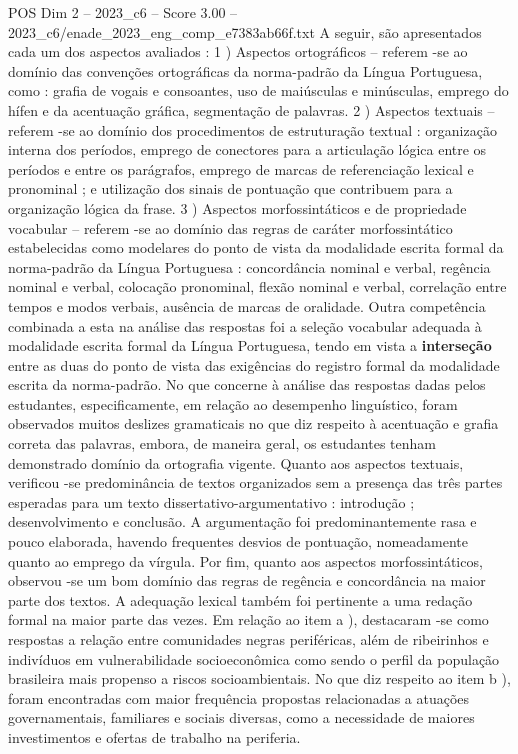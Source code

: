 \begin{textsample}{POS Dim 2 – 2023\_c6 – Score 3.00 – 2023\_c6/enade\_2023\_eng\_comp\_e7383ab66f.txt}
A seguir, são apresentados cada um dos aspectos avaliados : 1 ) Aspectos ortográficos – referem -se ao domínio das convenções ortográficas da norma-padrão da Língua Portuguesa, como : grafia de vogais e consoantes, uso de maiúsculas e minúsculas, emprego do hífen e da acentuação gráfica, segmentação de palavras. 2 ) Aspectos textuais – referem -se ao domínio dos procedimentos de estruturação textual : organização interna dos períodos, emprego de conectores para a articulação lógica entre os períodos e entre os parágrafos, emprego de marcas de referenciação lexical e pronominal ; e utilização dos sinais de pontuação que contribuem para a organização lógica da frase. 3 ) Aspectos morfossintáticos e de propriedade vocabular – referem -se ao domínio das regras de caráter morfossintático estabelecidas como modelares do ponto de vista da modalidade escrita formal da norma-padrão da Língua Portuguesa : concordância nominal e verbal, regência nominal e verbal, colocação pronominal, flexão nominal e verbal, correlação entre tempos e modos verbais, ausência de marcas de oralidade.
Outra competência combinada a esta na análise das respostas foi a seleção vocabular adequada à modalidade escrita formal da Língua Portuguesa, tendo em vista a \textbf{interseção} entre as duas do ponto de vista das exigências do registro formal da modalidade escrita da norma-padrão.
No que concerne à análise das respostas dadas pelos estudantes, especificamente, em relação ao desempenho linguístico, foram observados muitos deslizes gramaticais no que diz respeito à acentuação e grafia correta das palavras, embora, de maneira geral, os estudantes tenham demonstrado domínio da ortografia vigente.
Quanto aos aspectos textuais, verificou -se predominância de textos organizados sem a presença das três partes esperadas para um texto dissertativo-argumentativo : introdução ; desenvolvimento e conclusão.
A argumentação foi predominantemente rasa e pouco elaborada, havendo frequentes desvios de pontuação, nomeadamente quanto ao emprego da vírgula.
Por fim, quanto aos aspectos morfossintáticos, observou -se um bom domínio das regras de regência e concordância na maior parte dos textos.
A adequação lexical também foi pertinente a uma redação formal na maior parte das vezes.
Em relação ao item a ), destacaram -se como respostas a relação entre comunidades negras periféricas, além de ribeirinhos e indivíduos em vulnerabilidade socioeconômica como sendo o perfil da população brasileira mais propenso a riscos socioambientais.
No que diz respeito ao item b ), foram encontradas com maior frequência propostas relacionadas a atuações governamentais, familiares e sociais diversas, como a necessidade de maiores investimentos e ofertas de trabalho na periferia.

\end{textsample}

